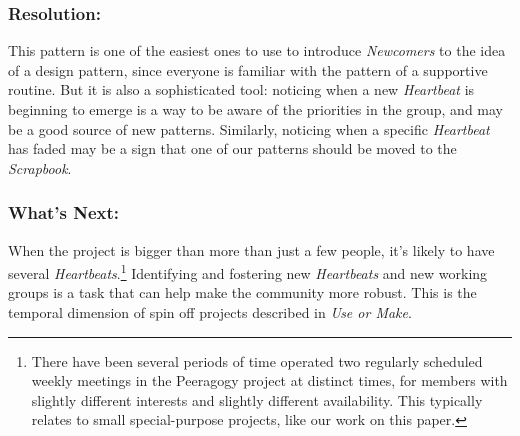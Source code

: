 \subsubsection*{Resolution:} This pattern is one of the easiest ones to use to introduce \emph{Newcomers} to the idea of a design pattern, since everyone is familiar with the pattern of a supportive routine.  But it is also a sophisticated tool: noticing when a new \emph{Heartbeat} is beginning to emerge is a way to be aware of the priorities in the group, and may be a good source of new patterns.  Similarly, noticing when a specific \emph{Heartbeat} has faded may be a sign that one of our patterns should be moved to the \emph{Scrapbook}.

\subsubsection*{What's Next:} When the project is bigger than more than just a few people, it's likely to have several \emph{Heartbeats}.\footnote{There have been several periods of time operated two regularly scheduled weekly meetings in the Peeragogy project at distinct times, for members with slightly different interests and slightly different availability.  This typically relates to small special-purpose projects, like our work on this paper.}  Identifying and fostering new \emph{Heartbeats} and new working groups is a task that can help make the community more robust.  This is the temporal dimension of spin off projects described in \emph{Use or Make}.
